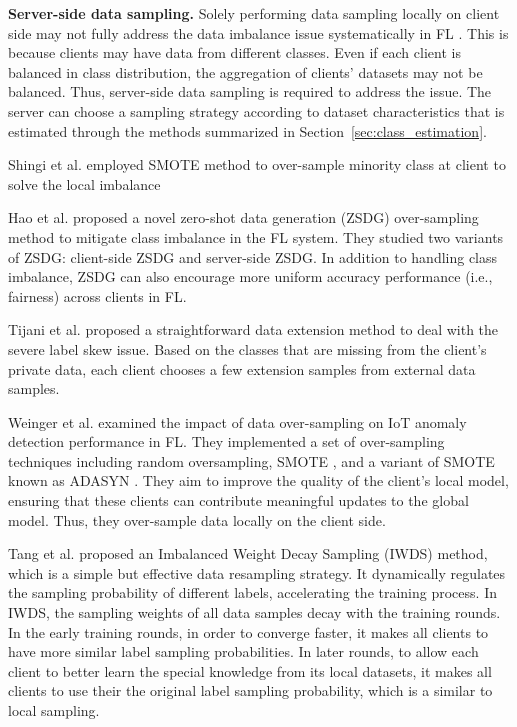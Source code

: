 \documentclass[10pt,journal,compsoc]{IEEEtran}
\begin{document}
\textbf{Server-side data sampling. } Solely performing data sampling locally on client side may not fully address the data imbalance issue systematically in FL \cite{duan2019astraea}. This is because clients may have data from different classes. Even if each client is balanced in class distribution, the aggregation of clients' datasets may not be balanced. Thus, server-side data sampling is required to address the issue. The server can choose a sampling strategy according to dataset characteristics that is estimated through the methods summarized in Section~\ref{sec:class_estimation}.

Shingi et al. \cite{shingi2020federated} employed SMOTE method to over-sample minority class at client to solve the local imbalance 

Hao et al. \cite{hao2021towards} proposed a novel zero-shot data generation (ZSDG) over-sampling method to mitigate class imbalance in the FL system. They studied two variants of ZSDG: client-side ZSDG and server-side ZSDG. In addition to handling class imbalance, ZSDG can also encourage more uniform accuracy performance (i.e., fairness) across clients in FL. 

Tijani et al. \cite{tijani2021federated} proposed a straightforward data extension method to deal with the severe label skew issue. Based on the classes that are missing from the client's private data, each client chooses a few extension samples from external data samples.

Weinger et al. \cite{weinger2022enhancing} examined the impact of data over-sampling on IoT anomaly detection performance in FL. They implemented a set of over-sampling techniques including random oversampling, SMOTE \cite{chawla2002smote}, and a variant of SMOTE known as ADASYN \cite{he2008adaptive}. They aim to improve the quality of the client's local model, ensuring that these clients can contribute meaningful updates to the global model. Thus, they over-sample data locally on the client side. 

Tang et al. \cite{tangdata} proposed an Imbalanced Weight Decay Sampling (IWDS) method, which is a simple but effective data resampling strategy. It dynamically regulates the sampling probability of different labels, accelerating the training process. In IWDS, the sampling weights of all data samples decay with the training rounds. In the early training rounds, in order to converge faster, it makes all clients to have more similar label sampling probabilities. In later rounds, to allow each client to better learn the special knowledge from its local datasets, it makes all clients to use their the original label sampling probability, which is a similar to local sampling.
\end{document}
